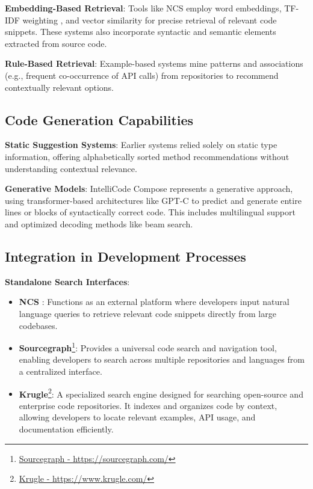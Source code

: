 \textbf{Embedding-Based Retrieval}: Tools like NCS employ word embeddings, TF-IDF weighting \cite{mitra2017}, and vector similarity for precise retrieval of relevant code snippets. These systems also incorporate syntactic and semantic elements extracted from source code.

\textbf{Rule-Based Retrieval}: Example-based systems mine patterns and associations (e.g., frequent co-occurrence of API calls) from repositories to recommend contextually relevant options.

\subsection{Code Generation Capabilities}
\textbf{Static Suggestion Systems}: Earlier systems \cite{bruch2009} relied solely on static type information, offering alphabetically sorted method recommendations without understanding contextual relevance.

\textbf{Generative Models}: IntelliCode Compose represents a generative approach, using transformer-based architectures \cite{vaswani2017} like GPT-C to predict and generate entire lines or blocks of syntactically correct code. This includes multilingual support and optimized decoding methods like beam search.

\subsection{Integration in Development Processes}
\textbf{Standalone Search Interfaces}:
    \begin{itemize}
        \item \textbf{NCS} \cite{sachdev2018}: Functions as an external platform where developers input natural language queries to retrieve relevant code snippets directly from large codebases.
        \item \textbf{Sourcegraph}\footnote{\href{https://sourcegraph.com/}{Sourcegraph - https://sourcegraph.com/}}: Provides a universal code search and navigation tool, enabling developers to search across multiple repositories and languages from a centralized interface.
        \item \textbf{Krugle}\footnote{\href{https://www.krugle.com/}{Krugle - https://www.krugle.com/}}: A specialized search engine designed for searching open-source and enterprise code repositories. It indexes and organizes code by context, allowing developers to locate relevant examples, API usage, and documentation efficiently.
    \end{itemize}

